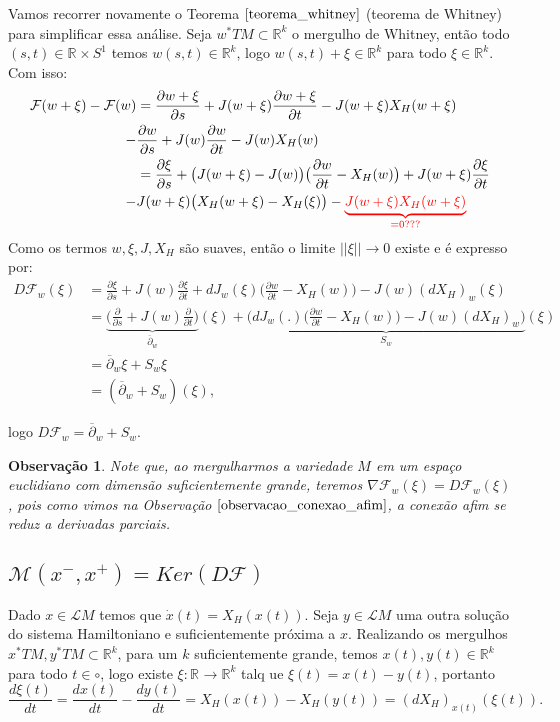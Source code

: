 \documentclass[12pt]{book}
\newtheorem{observacao}[teorema]{Observação}
\newcommand{\bigparenteses}[1]{\big( #1 \big) }
\newcommand{\campohamiltoniano}[1]{X_{H}(#1)}
\newcommand{\circulo}{S^{1}}
\newcommand{\derivada}[2]{\frac{d #1}{d #2}}
\newcommand{\derivadaparcial}[2]{\frac{\partial #1}{\partial #2}}
\newcommand{\diferencialhamiltoniano}[1]{(dX_{H})_{#1}}
\newcommand{\mapafloer}{\mathcal{F}}
\newcommand{\mapafloerdefinicao}[1]{\derivadaparcial{#1}{s} + J(#1)\derivadaparcial{#1}{t} - J(#1)X_{H}(#1)}
\newcommand{\mapafloerparametro}[1]{\mathcal{F}(#1)}
\newcommand{\norma}[1]{||#1||}
\newcommand{\operadorcauchyabrev}[1]{\overline{\partial}_{#1}}
\newcommand{\orbitasconectantespadrao}{\mathcal{M}(x^{-}, x^{+})}
\newcommand{\pullbackfibradotangente}[2]{#1^{*}T#2}
\newcommand{\pullbackfibradotangenteM}[1]{\pullbackfibradotangente{#1}{M}}
\newcommand{\retacartesianocirculo}{\real{} \times \circulo}
\newcommand{\real}[1]{\mathbb{R}^{#1}}
\newcommand{\solucoesperiodicascontrateis}{\mathcal{L}M}
\newcommand{\vermelho}[1]{{\color{red}#1}}
\begin{document}
	Vamos recorrer novamente o Teorema $\ref{teorema_whitney}$ (teorema de Whitney) para simplificar essa análise. Seja $\pullbackfibradotangenteM{w} \subset \real{k}$ o mergulho de Whitney, então todo $(s,t) \in \retacartesianocirculo$ temos $w(s,t) \in \real{k}$, logo  $ w(s,t)+\xi \in \real{k}$ para todo $\xi \in \real{k}$. Com isso:
	$$
	\begin{aligned}
		\mapafloerparametro{w+\xi}-\mapafloerparametro{w}
		&= \mapafloerdefinicao{w+\xi}
		\\
		 - & \mapafloerdefinicao{w}
		\\
		&=\derivadaparcial{\xi}{s} + \bigparenteses{J(w+\xi)-J(w)}\bigparenteses{\derivadaparcial{w}{t} - X_{H}(w)} + J(w+\xi)\derivadaparcial{\xi}{t} 
		\\
		- & J(w+\xi)\bigparenteses{X_{H}(w+\xi) - X_{H}(\xi)} - \vermelho{\underbrace{J(w+\xi)X_{H}(w+\xi)}_{=0???}}
	\end{aligned}
	$$
	Como os termos $w, \xi, J, X_{H}$ são suaves, então o limite $\norma{\xi} \to 0$ existe e é expresso por:
	$$
	\begin{aligned}
	D\mapafloer_{w}(\xi) 
	&= \derivadaparcial{\xi}{s} + J(w)\derivadaparcial{\xi}{t}+ dJ_{w}(\xi)\bigparenteses{\derivadaparcial{w}{t} - X_{H}(w)} - J(w) \diferencialhamiltoniano{w}(\xi)
	\\
	&= \underbrace{\Big( \derivadaparcial{}{s} + J(w)\derivadaparcial {}{t}\Big)}_{\overline{\partial}_{w}}(\xi)+ \underbrace{\Big(dJ_{w}(.)\bigparenteses{\derivadaparcial{w}{t} - X_{H}(w)} - J(w) \diferencialhamiltoniano{w}\Big)}_{S_{w}}(\xi)
	\\
	&= \operadorcauchyabrev{w} \xi + S_{w}\xi
	\\
	&= (\operadorcauchyabrev{w}  + S_{w})(\xi),
	\end{aligned}
	$$
	
	logo $ D\mapafloer_{w}= \operadorcauchyabrev{w}  + S_{w}$.
	
	\begin{observacao}
		Note que, ao mergulharmos a variedade $M$ em um espaço euclidiano com dimensão suficientemente grande, teremos $\nabla \mapafloer_{w}(\xi)=D\mapafloer_{w}(\xi)$, pois como vimos na Observação $\ref{observacao_conexao_afim}$, a conexão afim se reduz a derivadas parciais.
	\end{observacao}
	
	\subsection{$\orbitasconectantespadrao = Ker(D\mapafloer)$}
	Dado $x \in \solucoesperiodicascontrateis$ temos que $\dot{x}(t) = \campohamiltoniano{x(t)}$. Seja $y \in \solucoesperiodicascontrateis$ uma outra solução do sistema Hamiltoniano e suficientemente próxima a $x$. Realizando os mergulhos $\pullbackfibradotangenteM{x}, \pullbackfibradotangenteM{y} \subset \real{k}$, para um $k$ suficientemente grande, temos  $x(t), y(t) \in \real{k}$ para todo $t \in \circ$, logo existe $\xi:\real{}\to \real{k}$ talq ue $\xi(t)=x(t)-y(t)$, portanto
	$$
	\derivada{\xi(t)}{t} = \derivada{x(t)}{t} -\derivada{y(t)}{t} = \campohamiltoniano{x(t)} - \campohamiltoniano{y(t)} =\diferencialhamiltoniano{x(t)}(\xi(t)).
	$$
	
\end{document}
